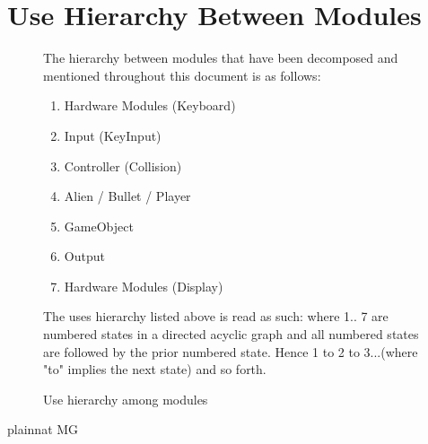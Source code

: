 \documentclass[12pt, titlepage]{article}
\begin{document}
\section{Use Hierarchy Between Modules} \label{SecUse}
\begin{figure}[H]
The hierarchy between modules that have been decomposed and mentioned throughout this document is as follows:
\begin{enumerate}
\item Hardware Modules (Keyboard)  
\item  Input (KeyInput) 
\item Controller (Collision) 
\item Alien / Bullet / Player 
\item GameObject 
\item Output 
\item Hardware Modules (Display)
\end{enumerate}
\color{red}
The uses hierarchy listed above is read as such: where 1.. 7 are numbered states in a directed acyclic graph and all numbered states are followed by the prior numbered state. Hence 1 to 2 to 3...(where "to" implies the next state) and so forth. 
\color{black}
\caption{Use hierarchy among modules}
\label{FigUH}
\end{figure}
 {plainnat}
 {MG}
\end{document}
